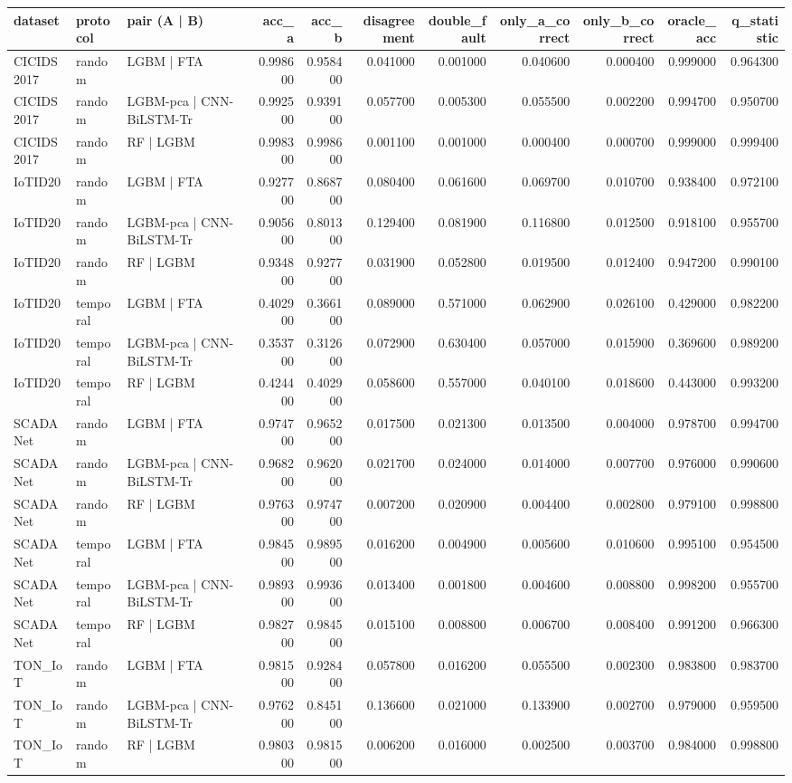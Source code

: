\begin{tabular}{lllrrrrrrrr}
\toprule
dataset & protocol & pair (A | B) & acc\_a & acc\_b & disagreement & double\_fault & only\_a\_correct & only\_b\_correct & oracle\_acc & q\_statistic \\
\midrule
CICIDS2017 & random & LGBM | FTA & 0.998600 & 0.958400 & 0.041000 & 0.001000 & 0.040600 & 0.000400 & 0.999000 & 0.964300 \\
CICIDS2017 & random & LGBM-pca | CNN-BiLSTM-Tr & 0.992500 & 0.939100 & 0.057700 & 0.005300 & 0.055500 & 0.002200 & 0.994700 & 0.950700 \\
CICIDS2017 & random & RF | LGBM & 0.998300 & 0.998600 & 0.001100 & 0.001000 & 0.000400 & 0.000700 & 0.999000 & 0.999400 \\
IoTID20 & random & LGBM | FTA & 0.927700 & 0.868700 & 0.080400 & 0.061600 & 0.069700 & 0.010700 & 0.938400 & 0.972100 \\
IoTID20 & random & LGBM-pca | CNN-BiLSTM-Tr & 0.905600 & 0.801300 & 0.129400 & 0.081900 & 0.116800 & 0.012500 & 0.918100 & 0.955700 \\
IoTID20 & random & RF | LGBM & 0.934800 & 0.927700 & 0.031900 & 0.052800 & 0.019500 & 0.012400 & 0.947200 & 0.990100 \\
IoTID20 & temporal & LGBM | FTA & 0.402900 & 0.366100 & 0.089000 & 0.571000 & 0.062900 & 0.026100 & 0.429000 & 0.982200 \\
IoTID20 & temporal & LGBM-pca | CNN-BiLSTM-Tr & 0.353700 & 0.312600 & 0.072900 & 0.630400 & 0.057000 & 0.015900 & 0.369600 & 0.989200 \\
IoTID20 & temporal & RF | LGBM & 0.424400 & 0.402900 & 0.058600 & 0.557000 & 0.040100 & 0.018600 & 0.443000 & 0.993200 \\
SCADANet & random & LGBM | FTA & 0.974700 & 0.965200 & 0.017500 & 0.021300 & 0.013500 & 0.004000 & 0.978700 & 0.994700 \\
SCADANet & random & LGBM-pca | CNN-BiLSTM-Tr & 0.968200 & 0.962000 & 0.021700 & 0.024000 & 0.014000 & 0.007700 & 0.976000 & 0.990600 \\
SCADANet & random & RF | LGBM & 0.976300 & 0.974700 & 0.007200 & 0.020900 & 0.004400 & 0.002800 & 0.979100 & 0.998800 \\
SCADANet & temporal & LGBM | FTA & 0.984500 & 0.989500 & 0.016200 & 0.004900 & 0.005600 & 0.010600 & 0.995100 & 0.954500 \\
SCADANet & temporal & LGBM-pca | CNN-BiLSTM-Tr & 0.989300 & 0.993600 & 0.013400 & 0.001800 & 0.004600 & 0.008800 & 0.998200 & 0.955700 \\
SCADANet & temporal & RF | LGBM & 0.982700 & 0.984500 & 0.015100 & 0.008800 & 0.006700 & 0.008400 & 0.991200 & 0.966300 \\
TON\_IoT & random & LGBM | FTA & 0.981500 & 0.928400 & 0.057800 & 0.016200 & 0.055500 & 0.002300 & 0.983800 & 0.983700 \\
TON\_IoT & random & LGBM-pca | CNN-BiLSTM-Tr & 0.976200 & 0.845100 & 0.136600 & 0.021000 & 0.133900 & 0.002700 & 0.979000 & 0.959500 \\
TON\_IoT & random & RF | LGBM & 0.980300 & 0.981500 & 0.006200 & 0.016000 & 0.002500 & 0.003700 & 0.984000 & 0.998800 \\
\bottomrule
\end{tabular}
